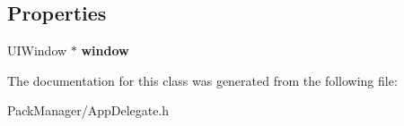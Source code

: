 \subsection*{Properties}
\begin{DoxyCompactItemize}
\item 
\hypertarget{interface_app_delegate_acf48ac24125e688cac1a85445cd7fac2}{U\-I\-Window $\ast$ {\bfseries window}}\label{interface_app_delegate_acf48ac24125e688cac1a85445cd7fac2}

\end{DoxyCompactItemize}


The documentation for this class was generated from the following file\-:\begin{DoxyCompactItemize}
\item 
Pack\-Manager/App\-Delegate.\-h\end{DoxyCompactItemize}
